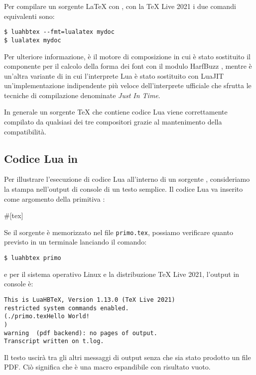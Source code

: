 Per compilare un sorgente \LaTeX{} con \LuaLaTeX{}, con la TeX Live 2021 i due
comandi equivalenti sono:
\begin{Verbatim}[numbers=none]
$ luahbtex --fmt=lualatex mydoc
$ lualatex mydoc
\end{Verbatim}

Per ulteriore informazione,  è il motore di composizione
 in cui è stato sostituito il componente per il calcolo della forma
dei font con il modulo HarfBuzz \cite{lib:harfbuzz}, mentre  è
un'altra variante di  in cui l'interprete Lua è stato sostituito
con LuaJIT \cite{prg:luajit} un'implementazione indipendente più veloce
dell'interprete ufficiale che sfrutta le tecniche di compilazione denominate
\emph{Just In Time}.

In generale un sorgente \TeX{} che contiene codice Lua viene correttamente
compilato da qualsiasi dei tre compositori grazie al mantenimento della
compatibilità.


\subsection{Codice Lua in \LuaTeX}

Per illustrare l'esecuzione di codice Lua all'interno di un sorgente \LuaTeX,
consideriamo la stampa nell'output di console di un testo semplice. Il codice
Lua va inserito come argomento della primitiva :
\begin{lines}
#[tex]
\bye
\end{lines}

Se il sorgente è memorizzato nel file \texttt{primo.tex}, possiamo verificare
quanto previsto in un terminale lanciando il comando:
\begin{Verbatim}[numbers=none]
$ luahbtex primo
\end{Verbatim}
e per il sistema operativo Linux e la distribuzione TeX Live 2021, l'output
in console è:
\begin{Verbatim}
This is LuaHBTeX, Version 1.13.0 (TeX Live 2021) 
restricted system commands enabled.
(./primo.texHello World!
)
warning  (pdf backend): no pages of output.
Transcript written on t.log.  
\end{Verbatim}

Il testo uscirà tra gli altri messaggi di output senza che sia stato prodotto un
file PDF. Ciò significa che  è una macro espandibile con risultato
vuoto.


